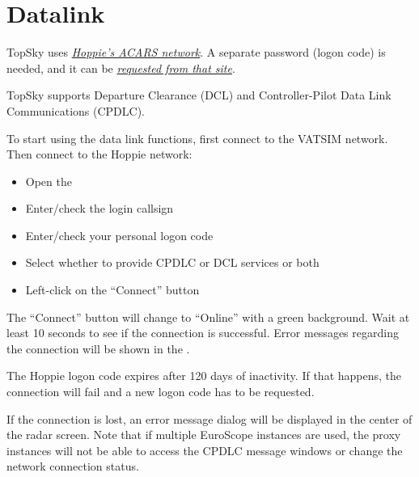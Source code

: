 \documentclass[a4paper,oneside,11pt]{memoir}
\begin{document}

\section{Datalink}

TopSky uses \textit{\href{http://www.hoppie.nl/acars}{Hoppie’s ACARS network}}. A separate password (logon code) is needed, and it can be \textit{\href{https://www.hoppie.nl/acars/system/register.html}{requested from that site}}. 

\bigskip

TopSky supports Departure Clearance (DCL) and Controller-Pilot Data Link Communications (CPDLC).

\bigskip

To start using the data link functions, first connect to the VATSIM network. Then connect to the Hoppie network:

\begin{itemize}
  \item Open the 
  \item Enter/check the login callsign
  \item Enter/check your personal logon code
  \item Select whether to provide CPDLC or DCL services or both
  \item Left-click on the “Connect” button
\end{itemize}

The “Connect” button will change to “Online” with a green background. Wait at least 10 seconds to see if the connection is successful. Error messages regarding the connection will be shown in the . 


The Hoppie logon code expires after 120 days of inactivity. If that happens, the connection will fail and a new logon code has to be requested.

\bigskip

If the connection is lost, an error message dialog will be displayed in the center of the radar screen. Note that if multiple EuroScope instances are used, the proxy instances will not be able to access the CPDLC message windows or change the network connection status.

\bigskip
\end{document}
